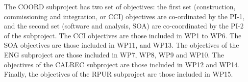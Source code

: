 The COORD subproject has two set of objectives: the first set (construction, commissioning and integration, or CCI) objectives are co-ordinated by the PI-1, and the second set (software and analysis, SOA) are co-coordinated by the PI-2 of the subproject. The CCI objectives are those included in WP1 to WP6. The SOA objectives are those included in WP11, and WP13. The objectives of the ENG subproject are those included in WP7, WP8, WP9 and WP10. The objectives of the CALREC subproject are those included in WP12 and WP14. Finally, the objectives of the RPUR subproject are those included in WP15.  


